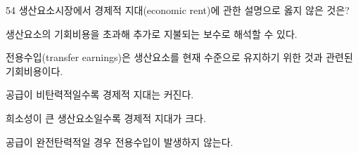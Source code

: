 \begin{question}{54}
생산요소시장에서 경제적 지대(economic rent)에 관한 설명으로 옳지 않은 것은?
\begin{choices}
  \item 생산요소의 기회비용을 초과해 추가로 지불되는 보수로 해석할 수 있다.
  \item 전용수입(transfer earnings)은 생산요소를 현재 수준으로 유지하기 위한 것과 관련된 기회비용이다.
  \item 공급이 비탄력적일수록 경제적 지대는 커진다.
  \item 희소성이 큰 생산요소일수록 경제적 지대가 크다.
  \item 공급이 완전탄력적일 경우 전용수입이 발생하지 않는다.
\end{choices}
\end{question}
